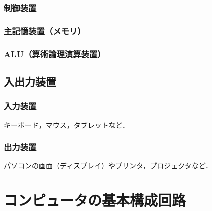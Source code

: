         \subsubsection{制御装置}

        \subsubsection{主記憶装置（メモリ）}

        \subsubsection{ALU（算術論理演算装置）}

    \subsection{入出力装置}
        \subsubsection{入力装置}
        キーボード，マウス，タブレットなど．

        \subsubsection{出力装置}
        パソコンの画面（ディスプレイ）やプリンタ，プロジェクタなど．

    \section{コンピュータの基本構成回路}
